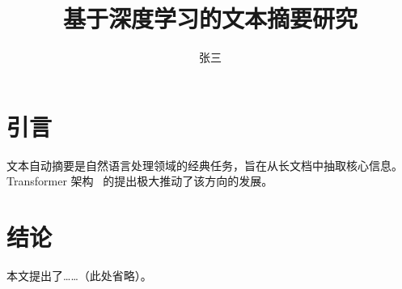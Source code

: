 \documentclass[12pt]{ctexart}
\title{基于深度学习的文本摘要研究}
\author{张三}
\begin{document}
\maketitle
\section{引言}
文本自动摘要是自然语言处理领域的经典任务，旨在从长文档中抽取核心信息。
Transformer 架构~\cite{vaswani2017} 的提出极大推动了该方向的发展。
\section{结论}
本文提出了……（此处省略）。
\end{document}
